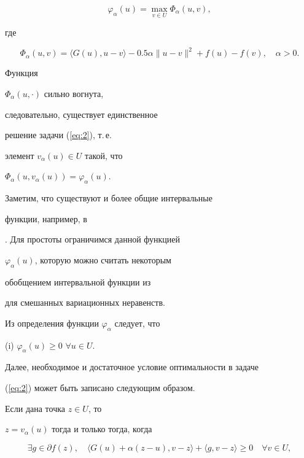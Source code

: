 \begin{equation} \label{eq:2}


\varphi_{\alpha }(u) = \max_{v \in U} \Phi_{\alpha }(u,v),


\end{equation}


где


\begin{equation} \label{eq:3}


\Phi_{\alpha }(u,v) = \langle G(u), u - v \rangle -


0.5 \alpha \| u- v \|^{2} + f(u)-f(v), \quad \alpha >0.


\end{equation}


Функция


$\Phi_{\alpha }(u, \cdot )$ сильно вогнута, 


следовательно, существует единственное


решение задачи (\ref{eq:2}), т.\,е.


элемент $v_{\alpha }(u) \in U$ такой, что


$\Phi_{\alpha }(u, v_{\alpha }(u)) = \varphi_{\alpha }(u)$.


Заметим, что существуют и более общие интервальные


функции, например, в


\cite{Pat97}. Для простоты ограничимся данной функцией


$\varphi_{\alpha }(u)$, которую можно считать некоторым 


обобщением интервальной функции из \cite{Fuk92} 


для смешанных вариационных неравенств.





Из определения функции $ \varphi_{\alpha }$ следует, что





(i) $ \varphi_{\alpha }(u) \geq 0$ $\forall u \in U$.





\noindent Далее, необходимое и достаточное условие оптимальности в задаче 


(\ref{eq:2}) может быть записано следующим образом.


Если дана точка $ z \in U$, то


$z= v_{\alpha }(u) $ тогда и только тогда, когда 


\begin{equation} \label{eq:4}


\exists g\in \partial f(z),


\quad


\langle G(u) + \alpha (z-u), v-z \rangle +


\langle g, v-z \rangle


\geq 0 \quad \forall v \in U,


\end{equation}


